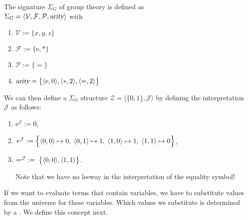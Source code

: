 \exampleEng
The signature $\Sigma_G$ of group theory is defined as \\[0.2cm]
\hspace*{1.3cm} $\Sigma_G = \langle \mathcal{V}, \mathcal{F}, \mathcal{P},\textsl{arity}\rangle$ 
\quad with
\begin{enumerate}
\item $\mathcal{V} := \{ x, y, z \}$
\item $\mathcal{F} := \{ \mathrm{e}, * \}$
\item $\mathcal{P} := \{ \mathtt{=} \}$
\item $\textsl{arity} = \bigl\{ \pair(\mathrm{e},0), \pair(*,2), \pair(\mathtt{=},2)\bigr\}$
\end{enumerate}
We can then define a $\Sigma_G$ structure $\mathcal{Z} = \langle \{0,1\},\mathcal{J}\rangle$ 
by defining the interpretation $\mathcal{J}$ 
as follows:
\begin{enumerate}
\item $\mathrm{e}^\mathcal{J} := 0$,
\item $*^\mathcal{J} := \Bigl\{ \pair(0,0) \mapsto 0,\;
                                 \pair(0,1) \mapsto 1,\;
                                 \pair(1,0) \mapsto 1,\;
                                 \pair(1,1) \mapsto 0 \Bigr\}$,
\item $=^\mathcal{J} \;:=\; \bigl\{ \pair(0,0), \pair(1,1) \bigr\}$.
                                 
      Note that we have no leeway in the interpretation of the equality symbol! \eox
\end{enumerate}

If we want to evaluate terms that contain variables, we have to substitute values from the universe 
for these variables. Which values we substitute is determined by a .  We define this concept next. 

